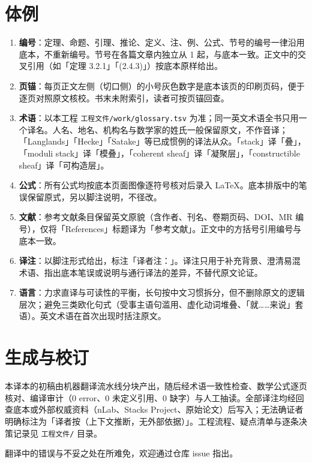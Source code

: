 \section*{体例}
\begin{enumerate}[leftmargin=2em,itemsep=0.2em]
\item \textbf{编号}：定理、命题、引理、推论、定义、注、例、公式、节号的编号一律沿用底本，不重新编号。节号在各篇文章内独立从 1 起，与底本一致。正文中的交叉引用（如「定理 3.2.1」「(2.4.3)」）按底本原样给出。
\item \textbf{页锚}：每页正文左侧（切口侧）的小号灰色数字是底本该页的印刷页码，便于逐页对照原文核校。书末未附索引，读者可按页锚回查。
\item \textbf{术语}：以本工程 \texttt{工程文件/work/glossary.tsv} 为准；同一英文术语全书只用一个译名。人名、地名、机构名与数学家的姓氏一般保留原文，不作音译；「Langlands」「Hecke」「Satake」等已成惯例的译法从众。「stack」译「叠」，「moduli stack」译「模叠」，「coherent sheaf」译「凝聚层」，「constructible sheaf」译「可构造层」。
\item \textbf{公式}：所有公式均按底本页面图像逐符号核对后录入 \LaTeX{}。底本排版中的笔误保留原式，另以脚注说明，不径改。
\item \textbf{文献}：参考文献条目保留英文原貌（含作者、刊名、卷期页码、DOI、MR 编号），仅将「References」标题译为「参考文献」。正文中的方括号引用编号与底本一致。
\item \textbf{译注}：以脚注形式给出，标注「译者注：」。译注只用于补充背景、澄清易混术语、指出底本笔误或说明与通行译法的差异，不替代原文论证。
\item \textbf{语言}：力求直译与可读性的平衡，长句按中文习惯拆分，但不删除原文的逻辑层次；避免三类欧化句式（受事主语句滥用、虚化动词堆叠、「就……来说」套语）。英文术语在首次出现时括注原文。
\end{enumerate}

\section*{生成与校订}
本译本的初稿由机器翻译流水线分块产出，随后经术语一致性检查、数学公式逐页核对、编译审计（0 error、0 未定义引用、0 缺字）与人工抽读。全部译注均经回查底本或外部权威资料（nLab、Stacks Project、原始论文）后写入；无法确证者明确标注为「译者按（上下文推断，无外部依据）」。工程流程、疑点清单与逐条决策记录见 \texttt{工程文件/} 目录。

翻译中的错误与不妥之处在所难免，欢迎通过仓库 issue 指出。

